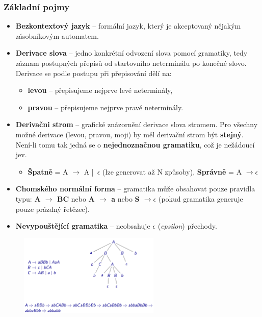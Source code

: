\subsubsection{Základní pojmy}
\begin{itemize}
\item \textbf{Bezkontextový jazyk} -- formální jazyk, který je akceptovaný nějakým zásobníkovým automatem.
\item \textbf{Derivace slova} -- jedno konkrétní odvození slova pomocí gramatiky, tedy záznam postupných přepisů od startovního neterminálu po konečné slovo. Derivace se podle postupu při přepisování dělí na:
\begin{itemize}
\item \textbf{levou} -- přepisujeme nejprve levé neterminály,
\item \textbf{pravou} -- přepisujeme nejprve pravé neterminály.
\end{itemize}
\item \textbf{Derivačni strom} -- grafické znázornění derivace slova stromem. Pro všechny možné derivace (levou, pravou, moji) by měl derivační strom být \textbf{stejný}. Není-li tomu tak jedná se o \textbf{nejednoznačnou gramatiku}, což je nežádoucí jev. 
\begin{itemize}
	\item \textbf{Špatně} = A $\rightarrow$ A | $\epsilon$ (lze generovat až N způsoby), \textbf{Správně} = A $\rightarrow \epsilon$ 
\end{itemize}
\item \textbf{Chomského normální forma} -- gramatika může obsahovat pouze pravidla typu: \textbf{A $\rightarrow$ BC} nebo \textbf{A $\rightarrow$ a} nebo \textbf{S $\rightarrow \epsilon$} (pokud gramatika generuje pouze prázdný řetězec).
\item \textbf{Nevypouštějící gramatika} -- neobsahuje $\epsilon$ (\textit{epsilon}) přechody.
\end{itemize}

\begin{figure}[H]
	\centering
	\includegraphics[width=0.6\textwidth]{assets/bg}
\end{figure}

